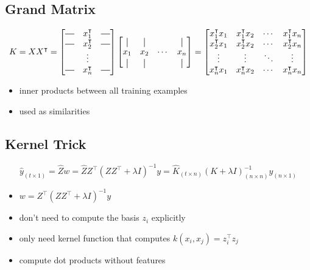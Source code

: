 \documentclass[10pt,landscape,a4paper]{article}
\newcommand*{\vertbar}{\rule[-1ex]{0.5pt}{2.5ex}}
\newcommand*{\horzbar}{\rule[.5ex]{2.5ex}{0.5pt}}
\begin{document}
\begin{multicols*}{5}
\subsection{Grand Matrix}
\begin{dmath*}
    K = XX^\intercal=
    \begin{bmatrix}
       \horzbar &  x_1^\intercal & \horzbar \\
       \horzbar &  x_2^\intercal & \horzbar \\
        & \vdots & \\
        \horzbar &  x_n^\intercal & \horzbar \\
    \end{bmatrix}
    \begin{bmatrix}
        \vertbar &  \vertbar & & \vertbar \\
        x_1 & x_2 & \cdots &  x_n \\
        \vertbar & \vertbar & & \vertbar \\
    \end{bmatrix}
    =
    \begin{bmatrix}
        x_1^\intercal x_1 & x_1^\intercal x_2 & \cdots & x_1^\intercal x_n \\
        x_2^\intercal x_1 & x_2^\intercal x_2 & \cdots & x_2^\intercal x_n \\
        \vdots & \vdots & \ddots & \vdots \\
        x_n^\intercal x_1 & x_n^\intercal x_2 & \cdots & x_n^\intercal x_n\\
    \end{bmatrix}
\end{dmath*}
\begin{itemize}
    \item inner products between all training examples
    \item used as similarities
\end{itemize}

\subsection{Kernel Trick}
\begin{dmath*}
    \hat{y}_{(t \times 1)} = \hat{Z}w = \hat{Z} Z^\intercal (Z Z^\intercal + \lambda I)^{-1} y = \hat{K}_{(t \times n)} (K + \lambda I)_{(n \times n)}^{-1} y_{(n \times 1)}
\end{dmath*}
\begin{itemize}
    \item \(w = Z^\intercal (Z Z^\intercal + \lambda I)^{-1} y\)
    \item don't need to compute the basis \(z_i\) explicitly
    \item only need kernel function that computes \(k(x_i,x_j) = z_i^\intercal z_j\)
    \item compute dot products without features
\end{itemize}


\end{multicols*}
\end{document}
